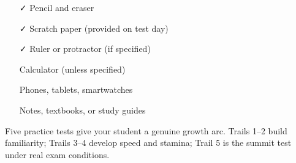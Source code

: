 {\vspace{5mm}

\noindent
\begin{minipage}[t]{0.47\linewidth}
\begin{tcolorbox}[
    enhanced,
    colback=funGreen!5,
    colframe=funGreen!35,
    arc=10pt, boxrule=0.8pt,
    left=4mm, right=4mm, top=3mm, bottom=3mm,
    title={\small\textcolor{white}{\faThumbsUp~Trail-Approved Gear}},
    colbacktitle=funGreen!55,
    fonttitle=\bfseries\sffamily,
]
    \small
    \begin{itemize}[leftmargin=*, itemsep=2pt]
        \item[\textcolor{funGreen}{\faCheck}] Pencil and eraser
        \item[\textcolor{funGreen}{\faCheck}] Scratch paper (provided on test day)
        \item[\textcolor{funGreen}{\faCheck}] Ruler or protractor (if specified)
    \end{itemize}
\end{tcolorbox}
\end{minipage}%
\hfill
\begin{minipage}[t]{0.47\linewidth}
\begin{tcolorbox}[
    enhanced,
    colback=funRed!5,
    colframe=funRed!35,
    arc=10pt, boxrule=0.8pt,
    left=4mm, right=4mm, top=3mm, bottom=3mm,
    title={\small\textcolor{white}{\faBan~Contraband}},
    colbacktitle=funRed!55,
    fonttitle=\bfseries\sffamily,
]
    \small
    \begin{itemize}[leftmargin=*, itemsep=2pt]
        \item[\textcolor{funRed}{\faTimes}] Calculator (unless specified)
        \item[\textcolor{funRed}{\faTimes}] Phones, tablets, smartwatches
        \item[\textcolor{funRed}{\faTimes}] Notes, textbooks, or study guides
    \end{itemize}
\end{tcolorbox}
\end{minipage}

\vspace{5mm}

\begin{tcolorbox}[
    enhanced,
    colback=funTeal!4,
    colframe=funTeal!25,
    arc=12pt, boxrule=0.8pt,
    left=5mm, right=5mm, top=4mm, bottom=4mm,
    title={\textcolor{white}{\faHeart~Expedition Guide (for Parents \& Guardians)}},
    colbacktitle=funTeal!55,
    fonttitle=\bfseries\sffamily,
]
    \small\color{funGrayDark}
    Five practice tests give your student a genuine growth arc.
    Trails 1--2 build familiarity; Trails 3--4 develop speed and stamina;
    Trail 5 is the summit test under real exam conditions.


\end{tcolorbox}}
